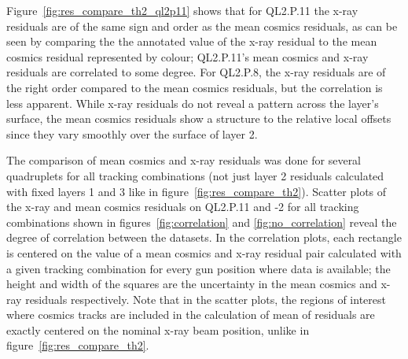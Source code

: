 Figure~\ref{fig:res_compare_th2_ql2p11} shows that for QL2.P.11 the x-ray residuals are of the same sign and order as the mean cosmics residuals, as can be seen by comparing the the annotated value of the x-ray residual to the mean cosmics residual represented by colour; QL2.P.11's mean cosmics and x-ray residuals are correlated to some degree. For QL2.P.8, the x-ray residuals are of the right order compared to the mean cosmics residuals, but the correlation is less apparent. While x-ray residuals do not reveal a pattern across the layer's surface, the mean cosmics residuals show a structure to the relative local offsets since they vary smoothly over the surface of layer 2. 

The comparison of mean cosmics and x-ray residuals was done for several quadruplets for all tracking combinations (not just layer 2 residuals calculated with fixed layers 1 and 3 like in figure~\ref{fig:res_compare_th2}). Scatter plots of the x-ray and mean cosmics residuals on QL2.P.11 and -2 for all tracking combinations shown in figures~\ref{fig:correlation} and \ref{fig:no_correlation} reveal the degree of correlation between the datasets. In the correlation plots, each rectangle is centered on the value of a mean cosmics and x-ray residual pair calculated with a given tracking combination for every gun position where data is available; the height and width of the squares are the uncertainty in the mean cosmics and x-ray residuals respectively. Note that in the scatter plots, the regions of interest where cosmics tracks are included in the calculation of mean of residuals are exactly centered on the nominal x-ray beam position, unlike in figure~\ref{fig:res_compare_th2}.


